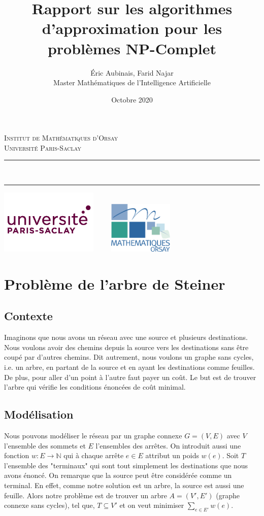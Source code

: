 \documentclass[11pt,french]{report}
\newcommand{\HRule}{\rule{\linewidth}{0.5mm}}
\begin{document}
	\title{Rapport sur les algorithmes d'approximation pour les problèmes NP-Complet\\}
	\author{
		Éric Aubinais, Farid Najar\\[0.2cm]
		Master Mathématiques de l'Intelligence Artificielle }
	\date{Octobre 2020}
	\makeatletter
	\begin{titlepage}
		\centering
		\textsc{\LARGE Institut de Mathématiques d'Orsay \\ Université Paris-Saclay}\\[4cm]
		\HRule \\
		{ \huge \bfseries \@title[2cm] }
		\begin{Large}
			\@author
		\end{Large}
		\HRule
		\vfill
		\includegraphics[width=0.35\textwidth]{paris-saclay.png}
		\hfill
		\includegraphics[width=0.35\textwidth, height=2.5cm]{imo.png}
		\pagebreak
		\tableofcontents
		\pagebreak
	\end{titlepage}

	\chapter{Problème de l'arbre de Steiner}
	\section{Contexte}
	Imaginons que nous avons un réseau avec une source et plusieurs destinations. Nous voulons avoir des chemins depuis la source vers les destinations sans être coupé par d'autres chemins. Dit autrement, nous voulons un graphe sans cycles, i.e. un arbre, en partant de la source et en ayant les destinations comme feuilles. De plus, pour aller d'un point à l'autre faut payer un coût. Le but est de trouver l'arbre qui vérifie les conditions énoncées de coût minimal.
	\section{Modélisation}
	Nous pouvons modéliser le réseau par un graphe connexe $G = (V, E)$ avec $V$ l'ensemble des sommets et $E$ l'ensembles des arrêtes. On introduit aussi une fonction $w:E\rightarrow \mathbb{N}$ qui à chaque arrête $e\in E$ attribut un poids $w(e)$. Soit $T$ l'ensemble des "terminaux" qui sont tout simplement les destinations que nous avons énoncé. On remarque que la source peut être considérée comme un terminal. En effet, comme notre solution est un arbre, la source est aussi une feuille. Alors notre problème est de trouver un arbre $A = (V', E')$ (graphe connexe sans cycles), tel que, $T\subseteq V'$ et on veut minimiser $\sum_{e\in E'}w(e)$.
\end{document}
